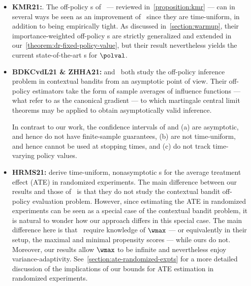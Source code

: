 \begin{itemize}
\item \textbf{KMR21:}.
  The off-policy \cs{}s of~\citet{karampatziakis2021off} --- reviewed in~\cref{proposition:kmr} --- can in several ways be seen as an improvement of~\citet{thomas2015high} since they are time-uniform, in addition to being empirically tight. As discussed in~\cref{section:warmup}, their importance-weighted off-policy \cs{}s are strictly generalized and extended in our~\cref{theorem:dr-fixed-policy-value}, but their result nevertheless yields the current state-of-the-art \cs{}s for $\polval$.

\item \textbf{BDKCvdL21 \& ZHHA21:} \citet{bibaut2021post} and~\citet{zhan2021off} both study the off-policy inference problem in contextual bandits from an asymptotic point of view. Their off-policy estimators take the form of sample averages of influence functions --- what \citet{bibaut2021post} refer to as the canonical gradient --- to which martingale central limit theorems may be applied to obtain asymptotically valid inference.

In contrast to our work, the confidence intervals of \citet{bibaut2021post} and \citet{zhan2021off} (a) are asymptotic, and hence do not have finite-sample guarantees, (b) are not time-uniform, and hence cannot be used at stopping times, and (c) do not track time-varying policy values.


  \item \textbf{HRMS21:} \citet[Section 4.2]{howard2018uniform} derive time-uniform, nonasymptotic \cs{}s for the average treatment effect (ATE) in randomized experiments. The main difference between our results and those of~\cite[Section 4.2]{howard2018uniform} is that they do not study the contextual bandit off-policy evaluation problem. However, since estimating the ATE in randomized experiments can be seen as a special case of the contextual bandit problem, it is natural to wonder how our approach differs in this special case. The main difference here is that~\citet{howard2018uniform} require knowledge of $\wmax$ --- or equivalently in their setup, the maximal and minimal propensity scores --- while ours do not. Moreover, our results allow $\wmax$ to be infinite and nevertheless enjoy variance-adaptivity. See~\cref{section:ate-randomized-expts} for a more detailed discussion of the implications of our bounds for ATE estimation in randomized experiments.
\end{itemize}


